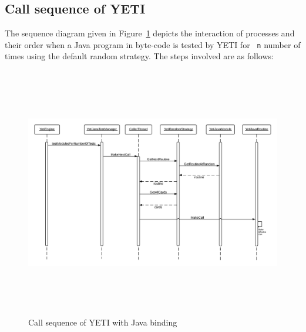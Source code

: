 \subsection{Call sequence of YETI}
The sequence diagram given in Figure~\ref{fig:yetiSequenceDiagram} depicts the interaction of processes and their order when a Java program in byte-code is tested by YETI for ~\verb+n+ number of times using the default random strategy.  The steps involved are as follows:

\bigskip
\begin{figure}[H]
	\centering
	\includegraphics[width=15.5cm, height=11cm]{chapter3/sequenceDiagram.png}
	\bigskip
	\caption{Call sequence of YETI with Java binding}
	\label{fig:yetiSequenceDiagram}
\end{figure}
\bigskip


